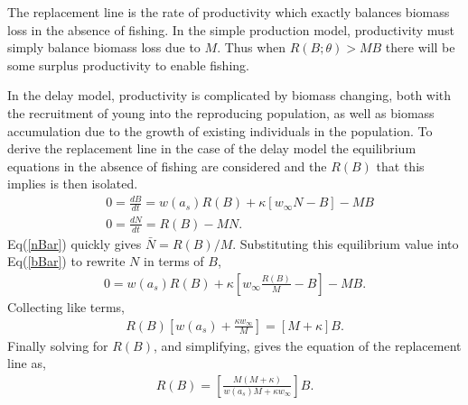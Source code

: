 %
The replacement line is the rate of productivity which exactly balances
biomass loss in the absence of fishing. In the simple production model, %
productivity must simply balance biomass loss due to $M$. Thus when
$R(B;\theta)>MB$ there will be some surplus productivity to enable
fishing.

%
In the delay model, productivity is complicated by biomass changing, both
with the recruitment of young into the reproducing population, as well as
biomass accumulation due to the growth of existing individuals in the
population. To derive the replacement line in the case of the delay model
the equilibrium equations in the absence of fishing are considered and
the $R(B)$ that this implies is then isolated.
%
\begin{align}
&0=\frac{dB}{dt} = w(a_s)R(B) + \kappa \left[w_\infty N-B\right] - MB \label{bBar}\\
&0=\frac{dN}{dt} = R(B) - MN. \label{nBar}
\end{align}
%
Eq(\ref{nBar}) quickly gives $\bar{N} = R(B)/M$. Substituting this equilibrium
value into Eq(\ref{bBar}) to rewrite $N$ in terms of $B$,
%
\begin{align}
0 = w(a_s)R(B) + \kappa \left[w_\infty \frac{R(B)}{M}-B\right] - MB. %
\end{align}
Collecting like terms,
\begin{align}
R(B)\left[w(a_s)+\frac{\kappa w_\infty}{M}\right] = \left[M+\kappa\right]B. %
\end{align}
Finally solving for $R(B)$, and simplifying, gives the equation of the replacement line as,
\begin{align}
R(B) = \left[\frac{M(M+\kappa)}{w(a_s)M+\kappa w_\infty}\right]B. %
\end{align}


